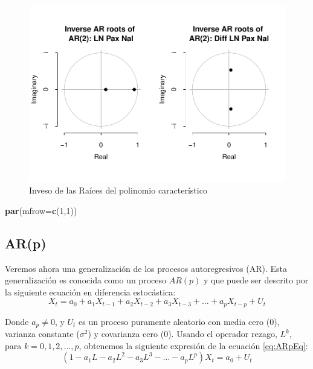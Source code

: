 \documentclass[
]{book}
\newenvironment{Shaded}{\begin{snugshade}}{\end{snugshade}}
\newcommand{\AttributeTok}[1]{\textcolor[rgb]{0.13,0.29,0.53}{#1}}
\newcommand{\DecValTok}[1]{\textcolor[rgb]{0.00,0.00,0.81}{#1}}
\newcommand{\FunctionTok}[1]{\textcolor[rgb]{0.13,0.29,0.53}{\textbf{#1}}}
\newcommand{\NormalTok}[1]{#1}
\begin{document}
\begin{figure}

{\centering \includegraphics{Notas-Series-Tiempo_files/figure-latex/fig48-1} 

}

\caption{Inveso de las Raíces del polinomio característico}\label{fig:fig48}
\end{figure}

\begin{Shaded}
\begin{Highlighting}[]
\FunctionTok{par}\NormalTok{(}\AttributeTok{mfrow=}\FunctionTok{c}\NormalTok{(}\DecValTok{1}\NormalTok{,}\DecValTok{1}\NormalTok{))}
\end{Highlighting}
\end{Shaded}

\hypertarget{arp}{%
\subsection{AR(p)}\label{arp}}

Veremos ahora una generalización de los procesos autoregresivos (AR). Esta generalización es conocida como un proceso \(AR(p)\) y que puede ser descrito por la siguiente ecuación en diferencia estocástica:
\begin{equation}
    X_t = a_0 + a_1 X_{t-1} + a_2 X_{t-2} + a_3 X_{t-3} + \ldots + a_p X_{t-p} + U_t
    \label{eq:ARpEq}
\end{equation}

Donde \(a_p \neq 0\), y \(U_t\) es un proceso puramente aleatorio con media cero (0), varianza constante (\(\sigma^2\)) y covarianza cero (0). Usando el operador rezago, \(L^k\), para \(k = 0, 1, 2, \ldots, p\), obtenemos la siguiente expresión de la ecuación \eqref{eq:ARpEq}:
\begin{equation}
    (1 - a_1 L - a_2 L^2 - a_3 L^3 - \ldots - a_p L^p) X_t = a_0 + U_t
\end{equation}
\end{document}
